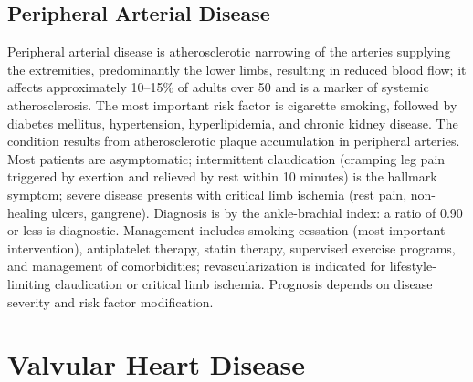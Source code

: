 






\label{sec:Peripheral Vascular Diseases}

\subsection{Peripheral Arterial Disease}
\label{sec:Peripheral Arterial Disease}
Peripheral arterial disease is atherosclerotic narrowing of the arteries supplying the extremities, predominantly the lower limbs, resulting in reduced blood flow; it affects approximately 10--15\% of adults over 50 and is a marker of systemic atherosclerosis. The most important risk factor is cigarette smoking, followed by diabetes mellitus, hypertension, hyperlipidemia, and chronic kidney disease. The condition results from atherosclerotic plaque accumulation in peripheral arteries. Most patients are asymptomatic; intermittent claudication (cramping leg pain triggered by exertion and relieved by rest within 10 minutes) is the hallmark symptom; severe disease presents with critical limb ischemia (rest pain, non-healing ulcers, gangrene). Diagnosis is by the ankle-brachial index: a ratio of 0.90 or less is diagnostic. Management includes smoking cessation (most important intervention), antiplatelet therapy, statin therapy, supervised exercise programs, and management of comorbidities; revascularization is indicated for lifestyle-limiting claudication or critical limb ischemia. Prognosis depends on disease severity and risk factor modification.

\section{Valvular Heart Disease}

